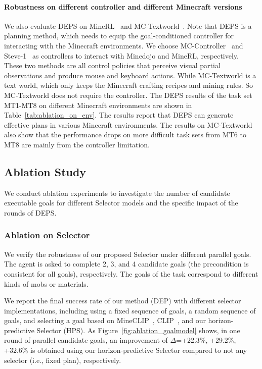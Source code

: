 \documentclass{article}
\begin{document}
\paragraph{Robustness on different controller and different Minecraft versions} 
We also evaluate DEPS on MineRL~\cite{vpt} and MC-Textworld~\cite{mcu}. Note that DEPS is a planning method, which needs to equip the goal-conditioned controller for interacting with the Minecraft environments. We choose MC-Controller~\cite{shaofei} and Steve-1~\cite{steve1} as controllers to interact with Minedojo and MineRL, respectively. These two methods are all control policies that perceive visual partial observations and produce mouse and keyboard actions. While MC-Textworld is a text world, which only keeps the Minecraft crafting recipes and mining rules. So MC-Textworld does not require the controller. The DEPS results of the task set MT1-MT8 on different Minecraft environments are shown in Table~\ref{tab:ablation_on_env}. The results report that DEPS can generate effective plans in various Minecraft environments. The results on MC-Textworld~\cite{mcu} also show that the performance drops on more difficult task sets from MT6 to MT8 are mainly from the controller limitation.



\subsection{Ablation Study}\label{sec:ablation}

We conduct ablation experiments to investigate the number of candidate executable goals for different Selector models and the specific impact of the rounds of DEPS.

\subsubsection{Ablation on Selector}

We verify the robustness of our proposed Selector under different parallel goals.
The agent is asked to complete 2, 3, and 4 candidate goals (the precondition is consistent for all goals), respectively.
The goals of the task correspond to different kinds of mobs or materials. 

We report the final success rate of our method (DEP) with different selector implementations, including using a fixed sequence of goals, a random sequence of goals, and selecting a goal based on MineCLIP~\cite{minedojo}, CLIP~\cite{clip}, and our horizon-predictive Selector (HPS).
As Figure~\ref{fig:ablation_goalmodel} shows, in one round of parallel candidate goals, an improvement of $\Delta$=+22.3\%, +29.2\%, +32.6\% is obtained using our horizon-predictive Selector compared to not any selector (i.e., fixed plan), respectively. 
\end{document}
